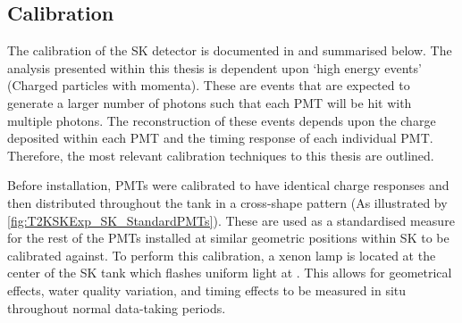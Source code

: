\subsection{Calibration}
\label{subsec:T2KSKExp_SKCalibration}

The calibration of the SK detector is documented in \cite{Abe_2014_SKCalib} and summarised below. The analysis presented within this thesis is dependent upon `high energy events' (Charged particles with  momenta). These are events that are expected to generate a larger number of photons such that each PMT will be hit with multiple photons. The reconstruction of these events depends upon the charge deposited within each PMT and the timing response of each individual PMT. Therefore, the most relevant calibration techniques to this thesis are outlined.

Before installation,  PMTs were calibrated to have identical charge responses and then distributed throughout the tank in a cross-shape pattern (As illustrated by \autoref{fig:T2KSKExp_SK_StandardPMTs}). These are used as a standardised measure for the rest of the PMTs installed at similar geometric positions within SK to be calibrated against.
To perform this calibration, a xenon lamp is located at the center of the SK tank which flashes uniform light at . This allows for geometrical effects, water quality variation, and timing effects to be measured in situ throughout normal data-taking periods.

